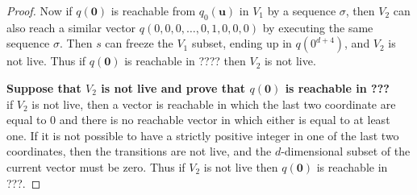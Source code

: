 \begin{proof}
Now if $q(\textbf{0})$ is reachable from $q_0(\textbf{u})$ in $V_1$ by a sequence $\sigma$, then $V_2$ can also reach a similar
vector $q(0,0,0,\ldots, 0, 1,0,0,0)$ by executing the same sequence $\sigma$.
Then $s$ can freeze the $V_1$ subset, 
ending up in $q(0^{d+4})$, and $V_2$ is not live.
Thus if $q(\textbf{0})$ is reachable in ???? then $V_2$ is not live.


{\bf Suppose that $V_2$ is not live and prove that 
$q(\textbf{0})$ is reachable in ???}\\

if $V_2$ is not live, then a vector  is reachable in which the last two coordinate are equal to $0$ and there is no reachable vector in which either is equal to at least one.
If it is not possible to have a strictly positive integer in one of the last two coordinates, then the transitions  are not live, and the
$d$-dimensional subset 
of the current vector must be zero.
Thus if $V_2$ is not live then 
$q(\textbf{0})$ is reachable in ???.
\end{proof}








